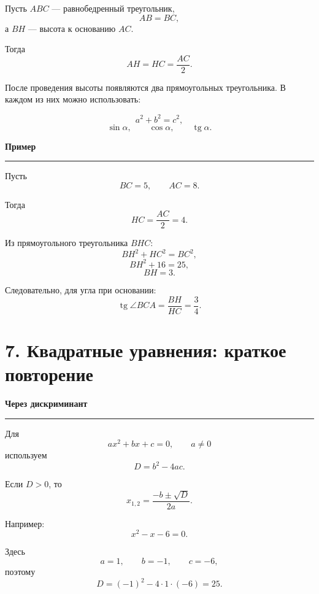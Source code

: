 \documentclass[a4paper,12pt]{article}
\DeclareMathOperator{\tg}{tg}
\newcommand{\accentline}{%
    \vspace{0.2em}
    {\color{accent}\rule{\linewidth}{0.6pt}}
    \vspace{0.5em}
}
\newcommand{\topic}[1]{%
    \vspace{0.5em}
    {\large\bfseries\color{darkaccent}#1}\par
    \accentline
}
\begin{document}
Пусть $ABC$ --- равнобедренный треугольник,
\[
AB=BC,
\]
а $BH$ --- высота к основанию $AC$.

Тогда
\[
AH=HC=\frac{AC}{2}.
\]

\begin{center}
\end{center}

После проведения высоты появляются два прямоугольных треугольника.
В каждом из них можно использовать:

\[
a^2+b^2=c^2,
\]
\[
\sin\alpha,
\qquad
\cos\alpha,
\qquad
\tg\alpha.
\]

\topic{Пример}

Пусть
\[
BC=5,\qquad AC=8.
\]

Тогда
\[
HC=\frac{AC}{2}=4.
\]

Из прямоугольного треугольника $BHC$:
\[
BH^2+HC^2=BC^2,
\]
\[
BH^2+16=25,
\]
\[
BH=3.
\]

Следовательно, для угла при основании:
\[
\tg\angle BCA
=
\frac{BH}{HC}
=
\frac34.
\]


\section*{\color{darkaccent}7. Квадратные уравнения: краткое повторение}

\topic{Через дискриминант}

Для
\[
ax^2+bx+c=0,\qquad a\ne0
\]
используем
\[
D=b^2-4ac.
\]

Если $D>0$, то
\[
x_{1,2}
=
\frac{-b\pm\sqrt D}{2a}.
\]

Например:
\[
x^2-x-6=0.
\]

Здесь
\[
a=1,\qquad b=-1,\qquad c=-6,
\]
поэтому
\[
D=(-1)^2-4\cdot1\cdot(-6)=25.
\]
\end{document}
